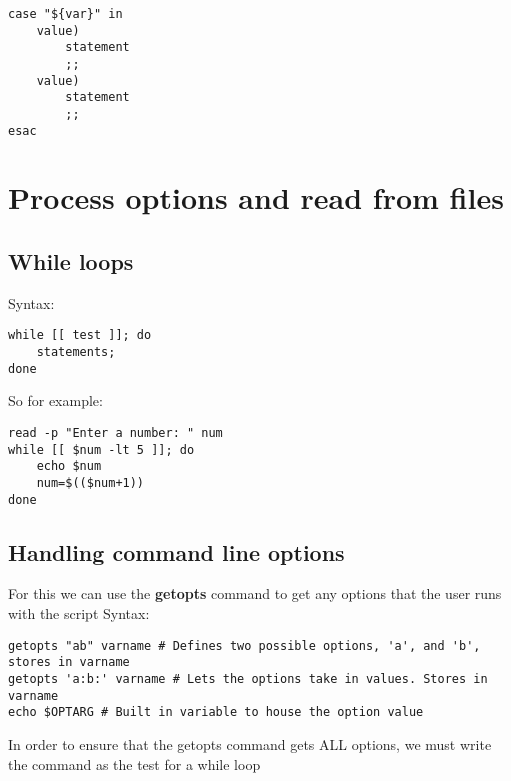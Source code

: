 \documentclass{report}
\begin{document}
    \begin{verbatim}
case "${var}" in 
    value)
        statement
        ;;
    value)
        statement
        ;;
esac
    \end{verbatim}
    \bigbreak \noindent
    
    \bigbreak \noindent 

    \pagebreak \bigbreak \noindent 
    \section{\LARGE Process options and read from files}
    \bigbreak \noindent 
    \subsection{While loops}
    \bigbreak \noindent 
    Syntax:
    
    \begin{verbatim}
while [[ test ]]; do
    statements;
done
    \end{verbatim}
    \bigbreak \noindent
    
    \bigbreak \noindent 
    So for example:
    
    \begin{verbatim}
read -p "Enter a number: " num
while [[ $num -lt 5 ]]; do
    echo $num
    num=$(($num+1))
done
    \end{verbatim}
    \bigbreak \noindent
    


    \bigbreak \noindent 
    \subsection{Handling command line options}
    \bigbreak \noindent 
    For this we can use the \textbf{getopts} command to get any options that the user runs with the script
    \bigbreak \noindent 
    Syntax:
    
    \begin{verbatim}
getopts "ab" varname # Defines two possible options, 'a', and 'b', stores in varname
getopts 'a:b:' varname # Lets the options take in values. Stores in varname
echo $OPTARG # Built in variable to house the option value
    \end{verbatim}
    \bigbreak \noindent
    
    \bigbreak \noindent 
    In order to ensure that the getopts command gets ALL options, we must write the command as the test for a while loop
    
\end{document}
